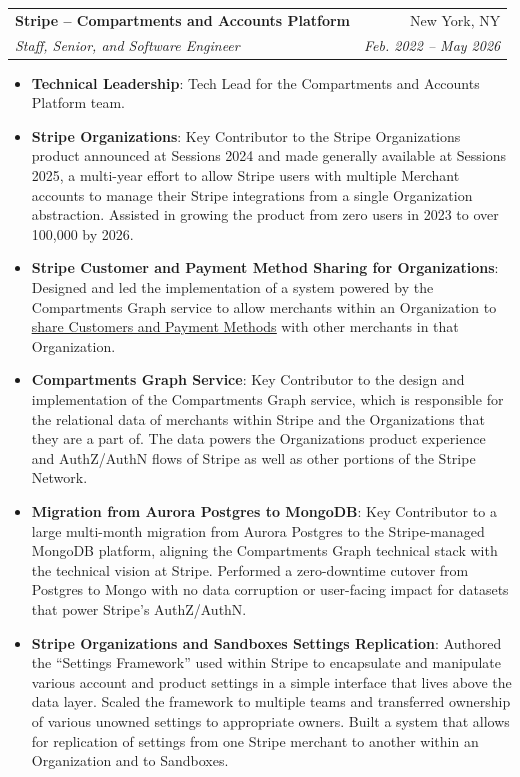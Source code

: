 \documentclass[letterpaper,11pt]{article}
\makeatletter
\newcommand{\resumeItem}[2]{%
  \item\small{\textbf{#1}{: #2 \vspace{-2pt}}}%
}
\newcommand{\resumeSubheading}[4]{%
  \vspace{-1pt}\item
  \begin{tabular*}{0.97\textwidth}[t]{l@{\extracolsep{\fill}}r}
    \textbf{#1} & #2 \\
    \textit{\small#3} & \textit{\small #4} \\
  \end{tabular*}\vspace{-5pt}%
}
\newcommand{\resumeLink}[2]{\underline{\href{#1}{#2}}}
\newcommand{\resumeItemListStart}{\begin{itemize}}
\newcommand{\resumeItemListEnd}{\end{itemize}\vspace{-5pt}}
\makeatother
\begin{document}
  \resumeSubheading
    {Stripe -- Compartments and Accounts Platform}{New York, NY}
    {Staff, Senior, and Software Engineer}{Feb. 2022 -- May 2026}
    \resumeItemListStart
      \resumeItem{Technical Leadership}
        {Tech Lead for the Compartments and Accounts Platform team.}
      \resumeItem{Stripe Organizations}
        {Key Contributor to the Stripe Organizations product announced at Sessions 2024 and made generally available at Sessions 2025, a multi-year effort to allow Stripe users with multiple Merchant accounts to manage their Stripe integrations from a single Organization abstraction. Assisted in growing the product from zero users in 2023 to over 100,000 by 2026.}
      \resumeItem{Stripe Customer and Payment Method Sharing for Organizations}
        {Designed and led the implementation of a system powered by the Compartments Graph service to allow merchants within an Organization to \resumeLink{https://docs.stripe.com/get-started/account/orgs/sharing/customers-payment-methods}{share Customers and Payment Methods} with other merchants in that Organization.}
      \resumeItem{Compartments Graph Service}
        {Key Contributor to the design and implementation of the Compartments Graph service, which is responsible for the relational data of merchants within Stripe and the Organizations that they are a part of. The data powers the Organizations product experience and AuthZ/AuthN flows of Stripe as well as other portions of the Stripe Network.}
      \resumeItem{Migration from Aurora Postgres to MongoDB}
        {Key Contributor to a large multi-month migration from Aurora Postgres to the Stripe-managed MongoDB platform, aligning the Compartments Graph technical stack with the technical vision at Stripe. Performed a zero-downtime cutover from Postgres to Mongo with no data corruption or user-facing impact for datasets that power Stripe's AuthZ/AuthN.}
      \resumeItem{Stripe Organizations and Sandboxes Settings Replication}
        {Authored the ``Settings Framework'' used within Stripe to encapsulate and manipulate various account and product settings in a simple interface that lives above the data layer. Scaled the framework to multiple teams and transferred ownership of various unowned settings to appropriate owners. Built a system that allows for replication of settings from one Stripe merchant to another within an Organization and to Sandboxes.}
    \resumeItemListEnd
\end{document}
